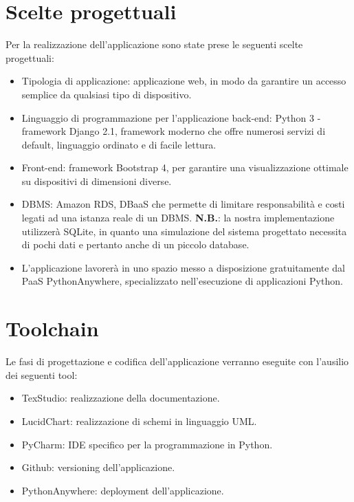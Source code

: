 \documentclass[10pt,a4paper]{article}
\begin{document}
	\section{Scelte progettuali}
	Per la realizzazione dell'applicazione sono state prese le seguenti scelte progettuali:
	\begin{itemize}
		\item Tipologia di applicazione: applicazione web, in modo da garantire un accesso semplice da qualsiasi tipo di dispositivo.
		\item Linguaggio di programmazione per l'applicazione back-end: Python 3 - framework Django 2.1, framework moderno che offre numerosi servizi di default, linguaggio ordinato e di facile lettura.
		\item Front-end: framework Bootstrap 4, per garantire una visualizzazione ottimale su dispositivi di dimensioni diverse.
		\item DBMS: Amazon RDS, DBaaS che permette di limitare responsabilità e costi legati ad una istanza reale di un DBMS. \textbf{N.B.}: la nostra implementazione utilizzerà SQLite, in quanto una simulazione del sistema progettato necessita di pochi dati e pertanto anche di un piccolo database.
		\item L'applicazione lavorerà in uno spazio messo a disposizione gratuitamente dal PaaS PythonAnywhere, specializzato nell'esecuzione di applicazioni Python.
	\end{itemize}

	\section{Toolchain}
	Le fasi di progettazione e codifica dell'applicazione verranno eseguite con l'ausilio dei seguenti tool:
	\begin{itemize}
		\item TexStudio: realizzazione della documentazione.
		\item LucidChart: realizzazione di schemi in linguaggio UML.
		\item PyCharm: IDE specifico per la programmazione in Python.
		\item Github: versioning dell'applicazione.
		\item PythonAnywhere: deployment dell'applicazione.
	\end{itemize}
\end{document}
